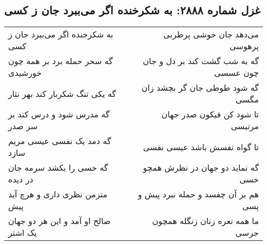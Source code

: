 \begin{center}
\section*{غزل شماره ۲۸۸۸: به شکرخنده اگر می‌ببرد جان ز کسی}
\label{sec:2888}
\begin{longtable}{l p{0.5cm} r}
به شکرخنده اگر می‌ببرد جان ز کسی
&&
می‌دهد جان خوشی پرطربی پرهوسی
\\
گه سحر حمله برد بر همه چون خورشیدی
&&
گه به شب گشت کند بر دل و جان چون عسسی
\\
گه یکی تنگ شکربار کند بهر نثار
&&
گه شود طوطی جان گر بچشد زان مگسی
\\
گه مدرس شود و درس کند بر سر صدر
&&
تا شود کن فیکون صدر جهان مرتبسی
\\
گه دمد یک نفسی عیسی مریم سازد
&&
تا گواه نفسش باشد عیسی نفسی
\\
گه خسی را بکشد سرمه جان در دیده
&&
گه نماید دو جهان در نظرش همچو خسی
\\
متزمن نظری داری و هرچ آید پیش
&&
هم بر آن چفسد و حمله نبرد پیش و پسی
\\
صالح او آمد و این هر دو جهان یک اشتر
&&
ما همه نعره زنان زنگله همچون جرسی
\\
\end{longtable}
\end{center}
